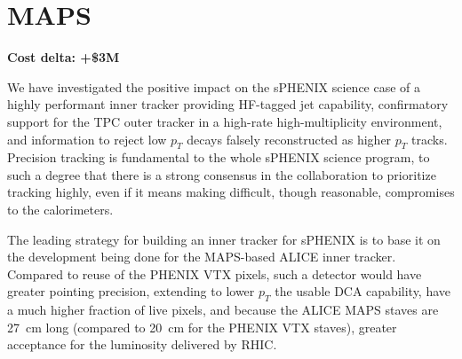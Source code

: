 \section{MAPS}
\label{maps}

\textbf{Cost delta: +\$3M}

We have investigated the positive impact on the sPHENIX science case
of a highly performant inner tracker providing HF-tagged jet
capability, confirmatory support for the TPC outer tracker in a
high-rate high-multiplicity environment, and information to reject low
$p_T$ decays falsely reconstructed as higher $p_T$ tracks.  Precision
tracking is fundamental to the whole sPHENIX science program, to such
a degree that there is a strong consensus in the collaboration to
prioritize tracking highly, even if it means making difficult, though
reasonable, compromises to the calorimeters.

The leading strategy for building an inner tracker for sPHENIX is to
base it on the development being done for the MAPS-based ALICE inner
tracker.  Compared to reuse of the PHENIX VTX pixels, such a detector
would have greater pointing precision, extending to lower $p_T$ the
usable DCA capability, have a much higher fraction of live pixels, and
because the ALICE MAPS staves are 27~cm long (compared to 20~cm for
the PHENIX VTX staves), greater acceptance for the luminosity
delivered by RHIC.

